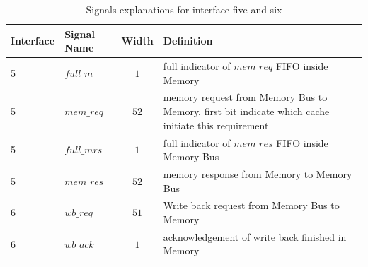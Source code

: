 \documentclass[12pt,frontmatter,copyright,thesis]{usfmanus}
\begin{document}
\begin{table}[h]
\caption{Signals explanations for interface five and six}

\begin{tabular}{|l|l|c | p{12cm} |}
\hline
Interface & Signal Name & Width & Definition \\
\hline
\hline
5	 &	$full\_m$ 			&$1$				& full indicator of $mem\_req$ FIFO inside Memory\\
\hline
5	 &	$mem\_req$ 			&$52$			& memory request from Memory Bus to Memory, first bit indicate which cache initiate this requirement\\
\hline
5	 &	$full\_mrs$ 			&$1$				& full indicator of $mem\_res$ FIFO inside Memory Bus\\
\hline
5	 &	$mem\_res$ 			&$52$			& memory response from Memory to Memory Bus \\
\hline

6	 &	$wb\_req$ 			&$51$			& Write back request from Memory Bus to Memory\\
\hline
6	 &	$wb\_ack$ 			&$1$				& acknowledgement of write back finished in Memory\\

\hline
\end{tabular}
\label{int3t}
\end{table}

%
%
\end{document}
